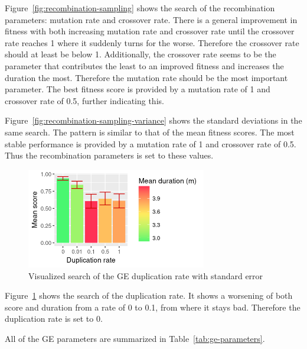Figure~\ref{fig:recombination-sampling} shows the search of the recombination parameters: mutation rate and crossover rate.
There is a general improvement in fitness with both increasing mutation rate and crossover rate until the crossover rate reaches 1 where it suddenly turns for the worse.
Therefore the crossover rate should at least be below 1.
Additionally, the crossover rate seems to be the parameter that contributes the least to an improved fitness and increases the duration the most.
Therefore the mutation rate should be the most important parameter.
The best fitness score is provided by a mutation rate of 1 and crossover rate of 0.5, further indicating this.

Figure~\ref{fig:recombination-sampling-variance} shows the standard deviations in the same search.
The pattern is similar to that of the mean fitness scores.
The most stable performance is provided by a mutation rate of 1 and crossover rate of 0.5.
Thus the recombination parameters is set to these values.

\begin{figure}
    \centering
    \includegraphics[width=0.7\textwidth]{figures/ge-duplication-sampling}
    \caption[Visualized search of the GE duplication rate]{Visualized search of the \gls{GE} duplication rate with standard error}
    \label{fig:duplication-sampling}
\end{figure}

Figure~\ref{fig:duplication-sampling} shows the search of the duplication rate.
It shows a worsening of both score and duration from a rate of 0 to 0.1, from where it stays bad.
Therefore the duplication rate is set to 0.

All of the \gls{GE} parameters are summarized in Table~\ref{tab:ge-parameters}.

